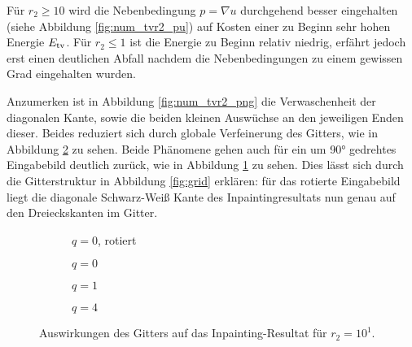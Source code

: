 \documentclass{mythesis}
\begin{document}
Für $r_2 \ge 10$ wird die Nebenbedingung $p = \nabla u$ durchgehend besser eingehalten (siehe Abbildung \ref{fig:num_tvr2_pu}) auf Kosten einer zu Beginn sehr hohen Energie $E_{\mathrm{tv}}$.
Für $r_2 \le 1$ ist die Energie zu Beginn relativ niedrig, erfährt jedoch erst einen deutlichen Abfall nachdem die Nebenbedingungen zu einem gewissen Grad eingehalten wurden.




Anzumerken ist in Abbildung \ref{fig:num_tvr2_png} die Verwaschenheit der diagonalen Kante, sowie die beiden kleinen Auswüchse an den jeweiligen Enden dieser.
Beides reduziert sich durch globale Verfeinerung des Gitters, wie in Abbildung \ref{fig:num_tvrefine_png} zu sehen.
Beide Phänomene gehen auch für ein um 90° gedrehtes Eingabebild deutlich zurück, wie in Abbildung \ref{fig:num_tvgrid} zu sehen.
Dies lässt sich durch die Gitterstruktur in Abbildung \ref{fig:grid} erklären: für das rotierte Eingabebild liegt die diagonale Schwarz-Weiß Kante des Inpaintingresultats nun genau auf den Dreieckskanten im Gitter.

\begin{figure}[ht]
    \centering
    \begin{subfigure}{0.2\textwidth}
	\centering
	\caption{$q=0$, rotiert}
	\label{fig:num_tvgrid}
    \end{subfigure}%
    \begin{subfigure}{0.2\textwidth}
	\centering
	\caption{$q=0$}
    \end{subfigure}%
    \begin{subfigure}{0.2\textwidth}
	\centering
	\caption{$q=1$}
    \end{subfigure}%
    \begin{subfigure}{0.2\textwidth}
	\centering
	\caption{$q=4$}
    \end{subfigure}%
    \caption{Auswirkungen des Gitters auf das Inpainting-Resultat für $r_2=10^1$.}
    \label{fig:num_tvrefine_png}
\end{figure}
\end{document}
